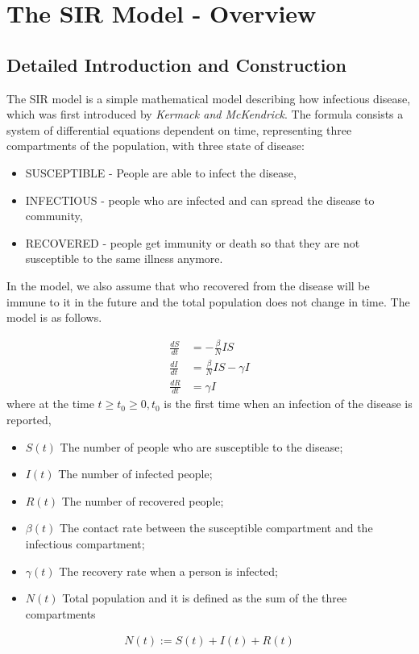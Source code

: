 \documentclass[a4paper]{article}
\begin{document}

\newpage
\tableofcontents
\newpage

\section{The SIR Model - Overview}
   \subsection{Detailed Introduction and Construction}
    \indent The SIR model is a simple mathematical model describing how infectious disease, which was first introduced by \textit{Kermack and McKendrick}. The formula consists a system of differential equations dependent on time, representing three compartments of the population, with three state of disease: 
    \begin{itemize}
        \item  SUSCEPTIBLE - People are able to infect the disease,
        \item  INFECTIOUS - people who are infected and can spread the disease to community,
        \item  RECOVERED - people get immunity or death so that they are not susceptible to the same illness anymore.
    \end{itemize}
    In the model, we also assume that who recovered from the disease will be immune to it in the future and the total population does not change in time. The model is as follows.
    
    \begin{align}
         \frac{dS}{dt} &= -\frac{\beta}{N}IS\label{1} \\
         \frac{dI}{dt} &= \frac{\beta}{N}IS - \gamma I\label{2} \\
         \frac{dR}{dt} &= \gamma I\label{3}
    \end{align}
    where at the time $t \geq t_0 \geq 0, t_0 $ is the first time when an infection of the disease is reported,
    \begin{itemize}
        \item $S(t)$ The number of people who are susceptible to the disease;
        \item $I(t)$ The number of infected people;
        \item $R(t)$ The number of recovered people;
        \item $\beta(t)$ The contact rate between the susceptible compartment and the infectious compartment;
        \item $\gamma (t)$ The recovery rate when a person is infected;
        \item $N(t)$ Total population and it is defined as the sum of the three compartments
    \end{itemize}
    \begin{align}
        N(t) := S(t) + I(t) + R(t) \label{4} 
    \end{align}
    
\end{document}

